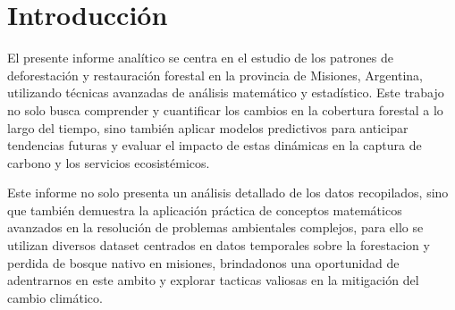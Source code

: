 \documentclass[11pt]{article}
\begin{document}
\hypersetup{linkcolor=black}
\tableofcontents
\newpage
\hypersetup{linkcolor=black}

\section{Introducción}


El presente informe analítico se centra en el estudio de los patrones de deforestación y restauración forestal en la provincia de Misiones, Argentina, utilizando técnicas avanzadas de análisis matemático y estadístico. Este trabajo no solo busca comprender y cuantificar los cambios en la cobertura forestal a lo largo del tiempo, sino también aplicar modelos predictivos para anticipar tendencias futuras y evaluar el impacto de estas dinámicas en la captura de carbono y los servicios ecosistémicos.

Este informe no solo presenta un análisis detallado de los datos recopilados, sino que también demuestra la aplicación práctica de conceptos matemáticos avanzados en la resolución de problemas ambientales complejos, para ello se utilizan diversos dataset centrados en datos temporales sobre la forestacion y perdida de bosque nativo en misiones, brindadonos una oportunidad de adentrarnos en este ambito y explorar tacticas valiosas en la mitigación del cambio climático.
\end{document}
